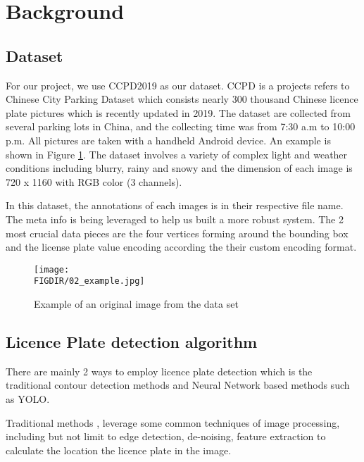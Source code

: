 
\section{Background}

\subsection{Dataset}
For our project, we use CCPD2019\cite{xu2018towards, li2017endtoend} as our dataset. 
CCPD is a projects refers to Chinese City Parking Dataset which consists 
nearly 300 thousand Chinese licence plate pictures which is recently updated in 2019.
The dataset are collected from several parking lots in China, 
and the collecting time was from 7:30 a.m to 10:00 p.m. 
All pictures are taken with a handheld Android device. An example is shown in Figure \ref{fig:02_example}.
The dataset involves a variety of complex light and weather conditions 
including blurry, rainy and snowy and the dimension of each image is 720 x 
1160 with RGB color (3 channels).

In this dataset, the annotations of each images is in their respective file name. The 
meta info is being leveraged to help us built a more robust system. The 2 most crucial 
data pieces are the four vertices forming around the bounding box and
the license plate value encoding according the their custom encoding format.

\begin{figure}
\centering
\texttt{[image: \\FIGDIR/02\_example.jpg]}
\caption{Example of an original image from the data set}
\label{fig:02_example}
\vspace{-0.25in}
\end{figure}

\subsection{Licence Plate detection algorithm}
There are mainly 2 ways to employ licence plate detection which is the 
traditional contour detection methods and Neural Network based methods 
such as YOLO\cite{redmon2015look}.

Traditional methods \cite{lpdectionComplex, NovelLPDectionWavelet,LPDetectMultiStage}, 
leverage some common techniques of image processing, including but not limit to edge detection, 
de-noising, feature extraction to calculate the location the licence plate in the image.


